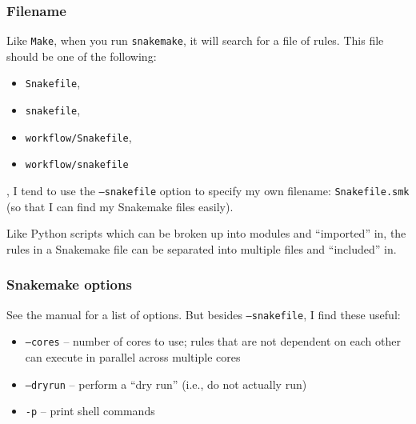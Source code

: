 \begin{frame}

\frametitle{Filename}

Like {\texttt{Make}}, when you run {\texttt{snakemake}}, it will search for a file of rules.  This file should be one of the following:
\begin{itemize}
  \item {\texttt{Snakefile}},
  \item {\texttt{snakefile}},
  \item {\texttt{workflow/Snakefile}},
  \item {\texttt{workflow/snakefile}}
\end{itemize}
\vs

{}, I tend to use the {\texttt{--snakefile}} option to specify my own filename:  {\texttt{Snakefile.smk}} (so that I can find my Snakemake files easily).
\vs

Like Python scripts which can be broken up into modules and ``imported'' in, the rules in a Snakemake file can be separated into multiple files and ``included'' in.

\end{frame}


\begin{frame}

\frametitle{Snakemake options}

See the manual for a list of options.  But besides {\texttt{--snakefile}}, I find these useful:
\begin{itemize}
  \item {\texttt{--cores}} -- number of cores to use; rules that are not dependent on each other can execute in parallel across multiple cores
  \item {\texttt{--dryrun}} -- perform a ``dry run'' (i.e., do not actually run)
  \item {\texttt{-p}} -- print shell commands
\end{itemize}

\end{frame}


